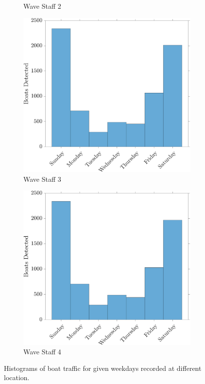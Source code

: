 \documentclass[
10pt, %
letterpaper, %
twoside, %
headinclude,footinclude, %
BCOR5mm, %
]{scrartcl}
\begin{document}
\begin{figure}[h!]
\begin{subfigure}[t]{0.49\linewidth}
		\caption{Wave Staff 2} 
		\label{fig:WeekL2}
	\end{subfigure}
	\begin{subfigure}[t]{0.49\linewidth}
		\centering
		\includegraphics[width=\linewidth]{figures/WeekDayHist_LOG3.pdf}
		\caption{Wave Staff 3} 
		\label{fig:WeekL3}
	\end{subfigure}
	\begin{subfigure}[t]{0.49\linewidth}
		\centering
		\includegraphics[width=\linewidth]{figures/WeekDayHist_LOG4.pdf}
		\caption{Wave Staff 4} 
		\label{fig:WeekL4}
	\end{subfigure}
	\caption{Histograms of boat traffic for given weekdays recorded at different location.}
	\label{fig:Weekdays}
\end{figure}
\end{document}
